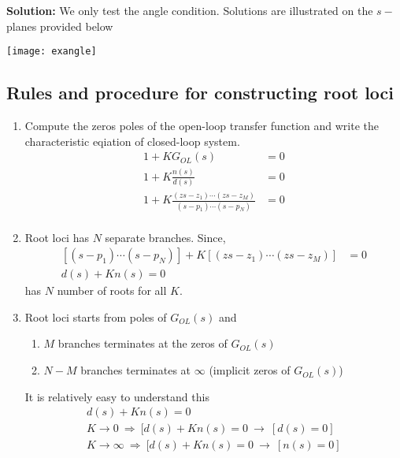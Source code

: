 \documentclass[twoside]{article}
\begin{document}
 \textbf{Solution:}  We only test the angle
 condition. Solutions are illustrated on the $s-$planes
provided below

 \begin{center}
\begin{minipage}[h]{\linewidth}
    \begin{center}
      \texttt{[image: exangle]}
    \end{center}
\end{minipage}
\end{center}

\subsection{Rules and procedure for constructing root loci}

\begin{enumerate} 

\item Compute the zeros poles of the open-loop 
transfer function and write the characteristic eqiation
of closed-loop system.
%
\begin{align*}
1 + K G_{OL}(s)  &= 0 \\
1 + K \frac{n(s)}{d(s)} &= 0 \\
1 + K \frac{(zs- z_1) \cdots (zs- z_M)}{(s - p_1) \cdots (s - p_N)} &= 0 \\
\end{align*}
%

\item Root loci has $N$ separate branches. Since,
%
\begin{align*}
\left[ (s - p_1) \cdots (s - p_N) \right] + K \left[ (zs- z_1) \cdots (zs- z_M) \right]  &= 0 \\
d(s) + K n(s) = 0
\end{align*}
%
has $N$ number of roots for all $K$.

\item Root loci starts from poles of $G_{OL}(s)$ and 
%
\begin{enumerate} 
   \item $M$ branches terminates at the zeros of $G_{OL}(s)$
   \item $N-M$ branches terminates at $\infty$ (implicit zeros of $G_{OL}(s)$)
\end{enumerate}

It is relatively easy to understand this 
%
\begin{align*}
d(s) + K n(s) = 0 
\\
K \to 0 \ \Rightarrow \ [d(s) + K n(s) = 0 \ \to \ [d(s) = 0]
\\
K \to \infty \ \Rightarrow \ [d(s) + K n(s) = 0 \ \to  \ [n(s) = 0]
\end{align*}


\end{enumerate}
\end{document}
